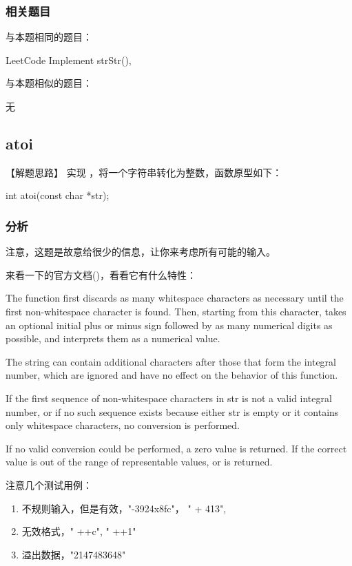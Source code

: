 \subsubsection{相关题目}
与本题相同的题目：
\begindot
\item LeetCode Implement strStr(), 
\myenddot

与本题相似的题目：
\begindot
\item  无
\myenddot


\subsection{atoi}
\label{sec:string-to-integer}


【解题思路】
实现 ，将一个字符串转化为整数，函数原型如下：
\begin{Code}
int atoi(const char *str);
\end{Code}


\subsubsection{分析}
注意，这题是故意给很少的信息，让你来考虑所有可能的输入。

来看一下的官方文档()，看看它有什么特性：

The function first discards as many whitespace characters as necessary until 
the first non-whitespace character is found. Then, starting from this 
character, takes an optional initial plus or minus sign followed by as many 
numerical digits as possible, and interprets them as a numerical value.

The string can contain additional characters after those that form the integral 
number, which are ignored and have no effect on the behavior of this function.

If the first sequence of non-whitespace characters in str is not a valid 
integral number, or if no such sequence exists because either str is empty or 
it contains only whitespace characters, no conversion is performed.

If no valid conversion could be performed, a zero value is returned. If the 
correct value is out of the range of representable values,  or  is returned.

注意几个测试用例：
\begin{enumerate}
\item 不规则输入，但是有效，"-3924x8fc"， "  +  413",
\item 无效格式，" ++c", " ++1"
\item 溢出数据，"2147483648"
\end{enumerate}


